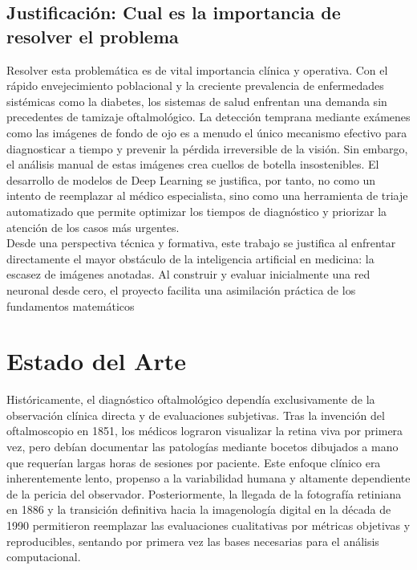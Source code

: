 \documentclass[12pt, a4paper]{article}
\begin{document}
\subsection{Justificación: Cual es la importancia de resolver el problema}

Resolver esta problemática es de vital importancia clínica y operativa. Con el rápido envejecimiento poblacional y la creciente prevalencia de enfermedades sistémicas como la diabetes, los sistemas de salud enfrentan una demanda sin precedentes de tamizaje oftalmológico. La detección temprana mediante exámenes como las imágenes de fondo de ojo es a menudo el único mecanismo efectivo para diagnosticar a tiempo y prevenir la pérdida irreversible de la visión. Sin embargo, el análisis manual de estas imágenes crea cuellos de botella insostenibles. El desarrollo de modelos de Deep Learning se justifica, por tanto, no como un intento de reemplazar al médico especialista, sino como una herramienta de triaje automatizado que permite optimizar los tiempos de diagnóstico y priorizar la atención de los casos más urgentes. \\

Desde una perspectiva técnica y formativa, este trabajo se justifica al enfrentar directamente el mayor obstáculo de la inteligencia artificial en medicina: la escasez de imágenes anotadas. Al construir y evaluar inicialmente una red neuronal desde cero, el proyecto facilita una asimilación práctica de los fundamentos matemáticos



\newpage
\section{Estado del Arte}
Históricamente, el diagnóstico oftalmológico dependía exclusivamente de la observación clínica directa y de evaluaciones subjetivas. Tras la invención del oftalmoscopio en 1851, los médicos lograron visualizar la retina viva por primera vez, pero debían documentar las patologías mediante bocetos dibujados a mano que requerían largas horas de sesiones por paciente. Este enfoque clínico era inherentemente lento, propenso a la variabilidad humana y altamente dependiente de la pericia del observador. Posteriormente, la llegada de la fotografía retiniana en 1886 y la transición definitiva hacia la imagenología digital en la década de 1990 permitieron reemplazar las evaluaciones cualitativas por métricas objetivas y reproducibles, sentando por primera vez las bases necesarias para el análisis computacional.\\
\end{document}
